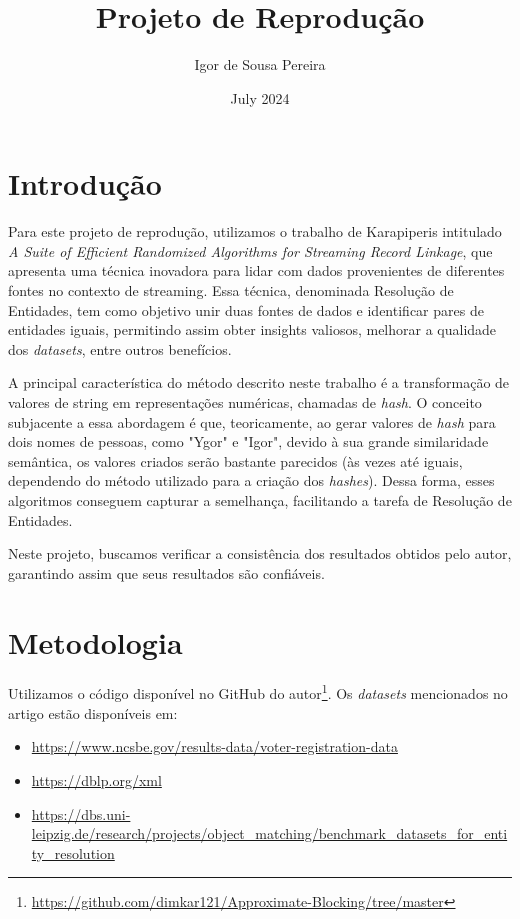 \documentclass{article}
\title{Projeto de Reprodução}
\author{Igor de Sousa Pereira}
\date{July 2024}
\begin{document}
\maketitle

\section{Introdução}
Para este projeto de reprodução, utilizamos o trabalho de Karapiperis intitulado \emph{A Suite of Efficient Randomized Algorithms for Streaming Record Linkage}, que apresenta uma técnica inovadora para lidar com dados provenientes de diferentes fontes no contexto de streaming. Essa técnica, denominada Resolução de Entidades, tem como objetivo unir duas fontes de dados e identificar pares de entidades iguais, permitindo assim obter insights valiosos, melhorar a qualidade dos \emph{datasets}, entre outros benefícios.

A principal característica do método descrito neste trabalho é a transformação de valores de string em representações numéricas, chamadas de \emph{hash}. O conceito subjacente a essa abordagem é que, teoricamente, ao gerar valores de \emph{hash} para dois nomes de pessoas, como "Ygor" e "Igor", devido à sua grande similaridade semântica, os valores criados serão bastante parecidos (às vezes até iguais, dependendo do método utilizado para a criação dos \emph{hashes}). Dessa forma, esses algoritmos conseguem capturar a semelhança, facilitando a tarefa de Resolução de Entidades.

Neste projeto, buscamos verificar a consistência dos resultados obtidos pelo autor, garantindo assim que seus resultados são confiáveis.

\section{Metodologia}
Utilizamos o código disponível no GitHub do autor\footnote{\url{https://github.com/dimkar121/Approximate-Blocking/tree/master}}. Os \emph{datasets} mencionados no artigo estão disponíveis em:
\begin{itemize}
    \item \url{https://www.ncsbe.gov/results-data/voter-registration-data}
    \item \url{https://dblp.org/xml}
    \item \url{https://dbs.uni-leipzig.de/research/projects/object_matching/benchmark_datasets_for_entity_resolution}
\end{itemize}
\end{document}
